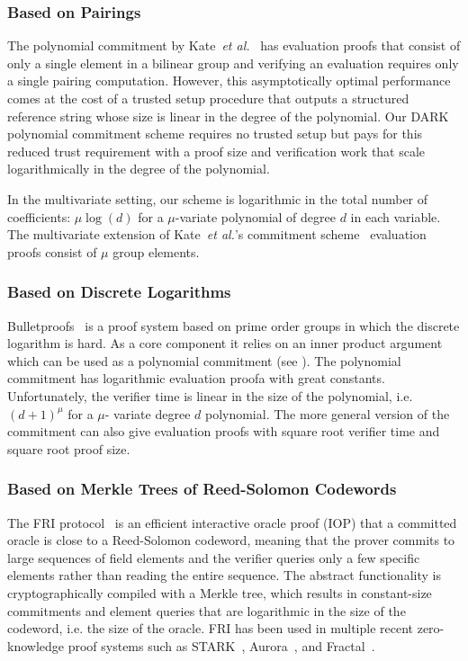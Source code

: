 \subsubsection{Based on Pairings}

The polynomial commitment by Kate~\emph{et al.}~\cite{AC:KatZavGol10} has evaluation proofs that consist of only a single element in a bilinear group and verifying an evaluation requires only a single pairing computation. However, this asymptotically optimal performance comes at the cost of a trusted setup procedure that outputs a structured reference string whose size is linear in the degree of the polynomial. Our DARK polynomial commitment scheme requires no trusted setup but pays for this reduced trust requirement with a proof size and verification work that scale logarithmically in the degree of the polynomial.

In the multivariate setting, our scheme is logarithmic in the total number of coefficients: $\mu\log(d)$ for a $\mu$-variate polynomial of degree $d$ in each variable. The multivariate extension of Kate~\emph{et al.}'s commitment scheme~\cite{SP:ZGKPP17} evaluation proofs consist of $\mu$ group elements.

\subsubsection{Based on Discrete Logarithms}

\textsf{Bulletproofs}~\cite{EC:BCCGP16,SP:BBBPWM18} is a proof system based on prime order groups in which the discrete logarithm is hard. As a core component it relies on an inner product argument which can be used as a polynomial commitment (see \cite{SP:WTSTW18}). The polynomial commitment has logarithmic evaluation proofa with great constants. Unfortunately, the verifier time is linear in the size of the polynomial, i.e. $(d+1)^\mu$ for a $\mu$- variate degree $d$ polynomial.
The more general version of the commitment\cite{EC:BCCGP16} can also give evaluation proofs with square root verifier time and square root proof size.


\subsubsection{Based on Merkle Trees of Reed-Solomon Codewords} \label{subsection:fri}

The FRI protocol~\cite{ICALP:BBHR18} is an efficient interactive oracle proof (IOP) that a committed oracle is close to a Reed-Solomon codeword, meaning that the prover commits to large sequences of field elements and the verifier queries only a few specific elements rather than reading the entire sequence. The abstract functionality is cryptographically compiled with a Merkle tree, which results in constant-size commitments and element queries that are logarithmic in the size of the codeword, i.e. the size of the oracle. FRI has been used in multiple recent zero-knowledge proof systems such as  \textsf{STARK}~\cite{C:BBHR19}, \textsf{Aurora}~\cite{EC:BCRSVW19}, and \textsf{Fractal}~\cite{Fractal}.

